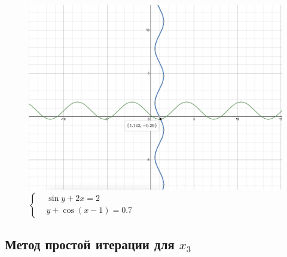 \documentclass{article}
\begin{document}
            \begin{figure}[H] 
                  \begin{center}  
                        \includegraphics[scale=0.4]{graph2.png}
                        \caption{\small \sl  $\begin{cases}
                              &\sin y + 2x=2\\
                              &y+\cos(x-1)=0.7
                        \end{cases}$}  
                  \end{center}  
            \end{figure}

      \subsection{Метод простой итерации для $x_3$}
\end{document}
